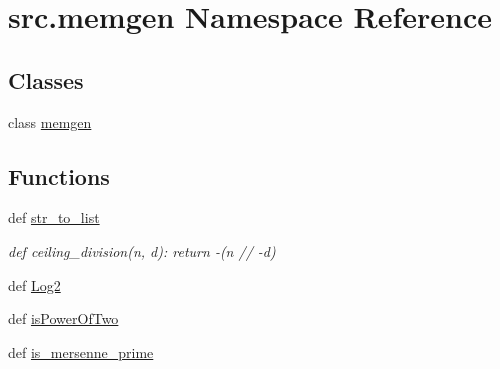 \hypertarget{namespacesrc_1_1memgen}{\section{src.\-memgen Namespace Reference}
\label{namespacesrc_1_1memgen}
}
\subsection*{Classes}
\begin{DoxyCompactItemize}
\item 
class \hyperlink{classsrc_1_1memgen_1_1memgen}{memgen}
\end{DoxyCompactItemize}
\subsection*{Functions}
\begin{DoxyCompactItemize}
\item 
def \hyperlink{namespacesrc_1_1memgen_a7186672ac4de86bdd47642c1523f65d4}{str\-\_\-to\-\_\-list}
\begin{DoxyCompactList}\small\item\em def ceiling\-\_\-division(n, d)\-: return -\/(n // -\/d) \end{DoxyCompactList}\item 
def \hyperlink{namespacesrc_1_1memgen_a0681757297f0240efc1c208203473ed0}{Log2}
\item 
def \hyperlink{namespacesrc_1_1memgen_aac853935f796eda5a6cad459fab65b17}{is\-Power\-Of\-Two}
\item 
def \hyperlink{namespacesrc_1_1memgen_a04e7781473fa4be269f21cb7b5af51fe}{is\-\_\-mersenne\-\_\-prime}
\end{DoxyCompactItemize}
